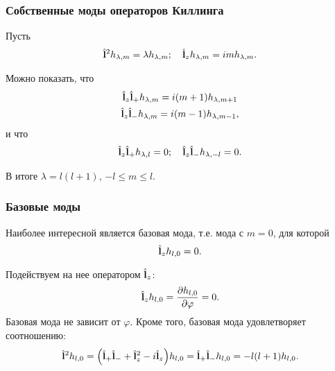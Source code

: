 \documentclass{beamer}
\begin{document}
    \begin{frame}\frametitle{Собственные моды операторов Киллинга}

        Пусть
        \begin{equation}\begin{gathered}
            \hat{\mathbf{l}}^2 h_{\lambda,m} = \lambda h_{\lambda,m} ; \quad
            \hat{\mathbf{l}}_z h_{\lambda,m} = i m h_{\lambda,m} .
        \end{gathered}\end{equation}

        Можно показать, что
        \begin{equation}\begin{gathered}
            \hat{\mathbf{l}}_z \hat{\mathbf{l}}_{+} h_{\lambda,m} = i (m + 1) h_{\lambda,m+1} \\
            \hat{\mathbf{l}}_z \hat{\mathbf{l}}_{-} h_{\lambda,m} = i (m - 1) h_{\lambda,m-1} ,
        \end{gathered}\end{equation}
        и что
        \begin{equation}\begin{gathered}
            \hat{\mathbf{l}}_z \hat{\mathbf{l}}_{+} h_{\lambda,l} = 0 ; \quad
            \hat{\mathbf{l}}_z \hat{\mathbf{l}}_{-} h_{\lambda,-l} = 0 .
        \end{gathered}\end{equation}

        В итоге $\lambda = l (l + 1)$, $- l \le m \le l$.

    \end{frame}


    \begin{frame}\frametitle{Базовые моды}

        Наиболее интересной является базовая мода, т.е. мода с $m = 0$, для которой
        \begin{equation}
            \hat{\mathbf{l}}_z h_{l, 0} = 0 .
        \end{equation}

        Подействуем на нее оператором $\hat{\mathbf{l}}_z$:
        \begin{equation}
            \hat{\mathbf{l}}_z h_{l, 0} = \pdv{h_{l, 0}}{\varphi} = 0 .
        \end{equation}
        Базовая мода не зависит от $\varphi$. Кроме того, базовая мода удовлетворяет соотношению:
        \begin{equation}\label{eq:basemode_eq}
            \hat{\mathbf{l}}^2 h_{l, 0}
                = \qty( \hat{\mathbf{l}}_{+} \hat{\mathbf{l}}_{-} + \hat{\mathbf{l}}_z^2 - i \hat{\mathbf{l}}_z ) h_{l, 0}
                = \hat{\mathbf{l}}_{+} \hat{\mathbf{l}}_{-} h_{l, 0}
                = - l (l + 1) h_{l, 0} .
        \end{equation}

    \end{frame}
\end{document}
